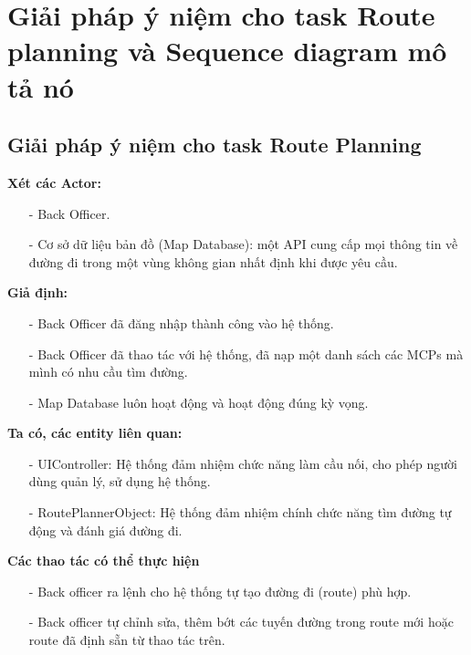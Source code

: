 
\section{Giải pháp ý niệm cho task Route planning và Sequence diagram mô tả nó}
    \subsection{Giải pháp ý niệm cho task Route Planning}
        \textbf{Xét các Actor: }

        \begin{itemize}
            \item[-] Back Officer.
            \item[-] Cơ sở dữ liệu bản đồ (Map Database): một API cung cấp mọi thông tin về đường đi trong một vùng không gian nhất định khi được yêu cầu.
        \end{itemize}

        \textbf{Giả định:}

        \begin{itemize}
            \item[-] Back Officer đã đăng nhập thành công vào hệ thống.
            \item[-] Back Officer đã thao tác với hệ thống, đã nạp một danh sách các MCPs mà mình có nhu cầu tìm đường.
            \item[-] Map Database luôn hoạt động và hoạt động đúng kỳ vọng.
        \end{itemize}

        \textbf{Ta có, các entity liên quan:}

        \begin{itemize}
            \item[-] UIController: Hệ thống đảm nhiệm chức năng làm cầu nối, cho phép người dùng quản lý, sử dụng hệ thống.
            \item[-] RoutePlannerObject: Hệ thống đảm nhiệm chính chức năng tìm đường tự động và đánh giá đường đi.
        \end{itemize}

        \textbf{Các thao tác có thể thực hiện}

        \begin{itemize}
            \item[-] Back officer ra lệnh cho hệ thống tự tạo đường đi (route) phù hợp.
            \item[-] Back officer tự chỉnh sửa, thêm bớt các tuyến đường trong route mới hoặc route đã định sẵn từ thao tác trên.
        \end{itemize}

